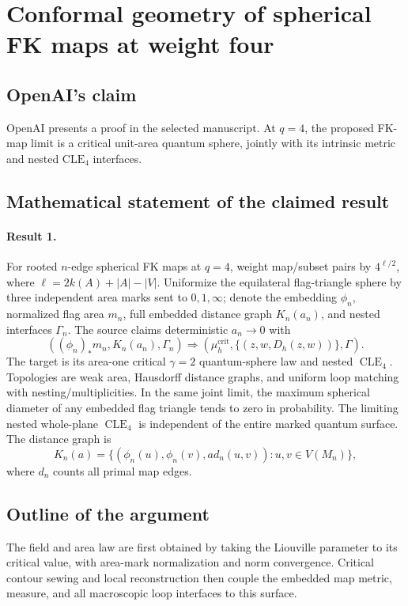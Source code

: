 \documentclass[11pt]{article}
\begin{document}
\section*{Conformal geometry of spherical FK maps at weight four}

\subsection{OpenAI's claim}
OpenAI presents a proof in the selected manuscript. At $q=4$, the proposed FK-map limit is a critical unit-area quantum sphere, jointly with its intrinsic metric and nested $\mathrm{CLE}_4$ interfaces.

\subsection{Mathematical statement of the claimed result}
\paragraph{Result 1.} For rooted \(n\)-edge spherical FK maps at \(q=4\), weight map/subset pairs by \(4^{\ell/2}\), where \(\ell=2k(A)+|A|-|V|\). Uniformize the equilateral flag-triangle sphere by three independent area marks sent to \(0,1,\infty\); denote the embedding \(\phi_n\), normalized flag area \(m_n\), full embedded distance graph \(K_n(a_n)\), and nested interfaces \(\Gamma_n\). The source claims deterministic \(a_n\to0\) with
\[
 ((\phi_n)_*m_n,K_n(a_n),\Gamma_n)
 \Longrightarrow(\mu_h^{\mathrm{crit}},\{(z,w,D_h(z,w))\},\Gamma).
\]
The target is its area-one critical \(\gamma=2\) quantum-sphere law and nested \(\operatorname{CLE}_4\). Topologies are weak area, Hausdorff distance graphs, and uniform loop matching with nesting/multiplicities. In the same joint limit, the maximum spherical diameter of any embedded flag triangle tends to zero in probability. The limiting nested whole-plane $\operatorname{CLE}_4$ is independent of the entire marked quantum surface. The distance graph is
\[
 K_n(a)=\{(\phi_n(u),\phi_n(v),a d_n(u,v)):u,v\in V(M_n)\},
\]
where $d_n$ counts all primal map edges.

\subsection{Outline of the argument}
The field and area law are first obtained by taking the Liouville parameter to its critical value, with area-mark normalization and norm convergence. Critical contour sewing and local reconstruction then couple the embedded map metric, measure, and all macroscopic loop interfaces to this surface.
\end{document}
